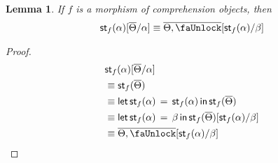 \documentclass[10pt]{article}
\newtheorem{lemma}{Lemma}
\theoremstyle{definition}
\newcommand\StI[2]{\ensuremath{\mathsf{st}_{#1}(#2)}}
\newcommand\StE[4]{\ensuremath{\mathsf{let} \, \StI{#1}{#3} \, = \, {#2} \, \mathsf{in} \, #4}}
\begin{document}
\begin{lemma}
If $f$ is a morphism of comprehension objects, then
\begin{align}
\StI{f}{\alpha}[\upstairs{\Theta}/\alpha] \equiv \upstairs{\Theta, \lock}[\StI{f}{\alpha}/\beta]
\end{align}
\end{lemma}
\begin{proof}
\begin{align*}
&\StI{f}{\alpha}[\upstairs{\Theta}/\alpha] \\
&\equiv \StI{f}{\upstairs{\Theta}} \\
&\equiv \StE{f}{\StI{f}{\alpha}}{\alpha}{\StI{f}{\upstairs{\Theta}}}\\
&\equiv \StE{f}{\beta}{\alpha}{\StI{f}{\upstairs{\Theta}}}[\StI{f}{\alpha}/\beta] \\
&\equiv \upstairs{\Theta, \lock}[\StI{f}{\alpha}/\beta] \\
\end{align*}
\end{proof}
\end{document}
